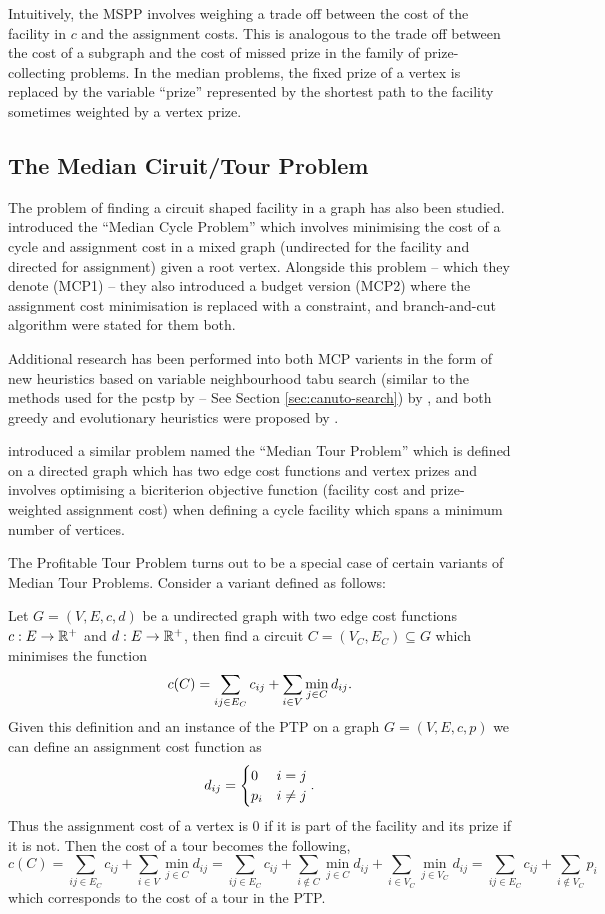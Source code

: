  Intuitively, the MSPP involves weighing a trade off between the cost of the facility
 in $c$ and the assignment costs. 
 This is analogous to the trade off between the cost of a subgraph and the cost of missed prize in the
 family of prize-collecting problems. In the median problems, the fixed prize of a vertex is
 replaced by the variable ``prize'' represented by the shortest path to the facility sometimes weighted
 by a vertex prize.
 \subsection{The Median Ciruit/Tour Problem}
 The problem of finding a circuit shaped facility in a graph has also been studied.
 \citet{labbe1999themedian} introduced the ``Median Cycle Problem'' which involves
 minimising the cost of a cycle and assignment cost in a mixed graph (undirected for
 the facility and directed for assignment) given a root vertex. Alongside this problem
 -- which they denote (MCP1) -- they also introduced a budget version (MCP2) where the
 assignment cost minimisation is replaced with a constraint, and branch-and-cut algorithm
 were stated for them both.

 Additional research has been performed into both MCP varients
 in the form of new heuristics based on variable neighbourhood tabu search
 (similar to the methods used for the \gls{pcstp} by \citet{canuto2001local} --
 See Section \ref{sec:canuto-search}) by \citet{perez2003variable}, and both
 greedy and evolutionary heuristics were proposed by \citet{renaud2004efficient}.
 
 \citet{current1994median} introduced a similar problem named the ``Median Tour Problem''
 which is defined on a directed graph which has two edge cost functions and vertex prizes
 and involves optimising a bicriterion objective function
 (facility cost and prize-weighted assignment cost)
 when defining a cycle facility which spans a minimum number of vertices.

 The Profitable Tour Problem turns out to be a special case of certain variants of Median
 Tour Problems. Consider a variant defined as follows:

 Let $G = (V, E, c, d)$ be a undirected graph with two edge cost functions
 $c : E \to \mathbb{R}^+$ and $d : E \to \mathbb{R}^+$, then find a circuit $C = (V_C, E_C) \subseteq G$
 which minimises
 the function
 $$c(C) = \sum_{ij \in E_C} c_{ij} + \sum_{i \in V} \min_{j \in C} d_{ij} \mathnormal{.}$$
 Given this definition and an instance of the PTP on a graph $G = (V, E, c, p)$
 we can define an assignment cost function as
 $$d_{ij} =
 \begin{cases}
   0 & i = j \\
   p_i & i \neq j
 \end{cases}\mathnormal{.}
 $$
 Thus the assignment cost of a vertex is 0 if it is part of the facility and its prize
 if it is not. Then the cost of a tour becomes the following,
 $$c(C) = \sum_{ij \in E_C} c_{ij} + \sum_{i \in V} \min_{j \in C} d_{ij} =
 \sum_{ij \in E_C} c_{ij} + \sum_{i \not\in C} \min_{j \in C} d_{ij} + \sum_{i \in V_C} \min_{j \in V_C} d_{ij}
 = \sum_{ij \in E_C} c_{ij} + \sum_{i \not\in V_C}  p_i$$
 which corresponds to the cost of a tour in the PTP.
